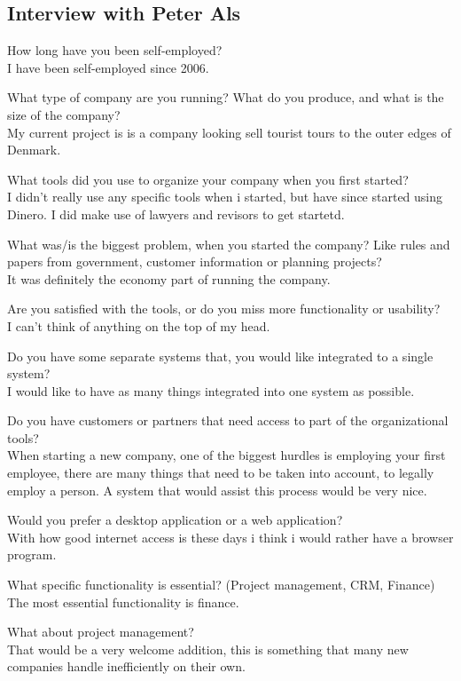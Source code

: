 \subsection{Interview with Peter Als}
How long have you been self-employed? \\
	I have been self-employed since 2006.	

What type of company are you running? What do you produce, and what is the size of the company? \\
	My current project is is a company looking sell tourist tours to the outer edges of Denmark.

What tools did you use to organize your company when you first started?\\
	I didn’t really use any specific tools when i started, but have since started using Dinero. I did make use of lawyers and revisors to get startetd.

What was/is the biggest problem, when you started the company? Like rules and papers from government, customer information or planning projects?\\
It was definitely the economy part of running the company.

Are you satisfied with the tools, or do you miss more functionality or usability?\\
I can’t think of anything on the top of my head.

Do you have some separate systems that, you would like integrated to a single system?\\
I would like to have as many things integrated into one system as possible.

Do you have customers or partners that need access to part of the organizational tools?\\
When starting a new company, one of the biggest hurdles is employing your first employee, there are many things that need to be taken into account, to legally employ a person. A system that would assist this process would be very nice.

Would you prefer a desktop application or a web application?\\
With how good internet access is these days i think i would rather have a browser program.

What specific functionality is essential? (Project management, CRM, Finance)\\
The most essential functionality is finance.

What about project management?\\
That would be a very welcome addition, this is something that many new companies handle inefficiently on their own. 



















